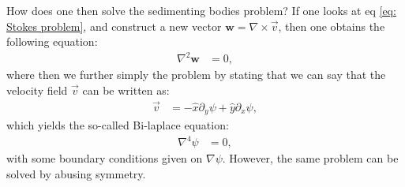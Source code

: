 \documentclass[a4paper]{article}
\begin{document}
\vspace*{.5cm}\noindent
How does one then solve the sedimenting bodies problem? If one looks at eq \eqref{eq: Stokes problem}, and construct a new vector $\mathbf{w} = \nabla\times\vec{v}$, then one obtains the following equation:
\begin{align*}
    \nabla^2\mathbf{w} &= 0,
\end{align*}where then we further simply the problem by stating that we can say that the velocity field $\vec{v}$ can be written as:
\begin{align*}
    \vec{v} &= -\hat{x}\partial_y \psi + \hat{y}\partial_x\psi,
\end{align*}which yields the so-called Bi-laplace equation:
\begin{align*}
    \nabla^4\psi &= 0,
\end{align*}with some boundary conditions given on $\nabla\psi$. However, the same problem can be solved by abusing symmetry.
\end{document}

